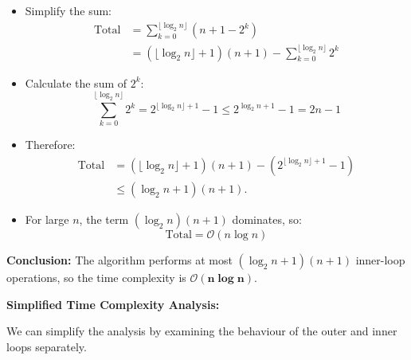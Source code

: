 \begin{example}
\begin{itemize}
\begin{itemize}
\[            \]
            \item Simplify the sum:
            \[
            \begin{aligned}
            \text{Total} &= \sum_{k=0}^{\lfloor \log_2 n \rfloor} (n + 1 - 2^k) \\
            &= (\lfloor \log_2 n \rfloor + 1)(n + 1) - \sum_{k=0}^{\lfloor \log_2 n \rfloor} 2^k
            \end{aligned}
            \]
            \item Calculate the sum of $2^k$:
            \[
            \sum_{k=0}^{\lfloor \log_2 n \rfloor} 2^k = 2^{\lfloor \log_2 n \rfloor + 1} - 1 \leq 2^{\log_2 n + 1} - 1 = 2n -1
            \]
            \item Therefore:
            \[
            \begin{aligned}
            \text{Total} &= (\lfloor\log_2 n\rfloor+1)(n+1) - (2^{\lfloor\log_2 n\rfloor+1}-1) \\
            &\leq (\log_2 n+1)(n+1).
            \end{aligned}
            \]
            \item For large $n$, the term $(\log_2 n)(n +1)$ dominates, so:
            \[
            \text{Total} = \mathcal{O}(n \log n)
            \]
        \end{itemize}
    \end{itemize}
    
    \textbf{Conclusion:} The algorithm performs at most $(\log_2 n+1)(n+1)$ inner-loop operations, so the time complexity is $\boldsymbol{\mathcal{O}(n \log n)}$.

    \textbf{Simplified Time Complexity Analysis:}

    We can simplify the analysis by examining the behaviour of the outer and inner loops separately.


\end{example}
